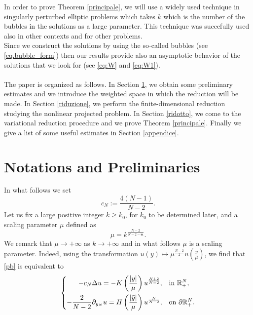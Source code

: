 \documentclass[11pt,a4paper]{amsart}
\begin{document}
In order to prove Theorem \ref{principale}, we will use a widely used technique in singularly perturbed elliptic problems which takes $k$ which is the number of the bubbles in the solutions as a large parameter. This technique was succefully used also in other contexts and for other problems.\\ Since we construct the solutions by using the so-called bubbles (see \eqref{eq.bubble_form}) then our results provide also an asymptotic behavior of the solutions that we look for (see \eqref{eq:W} and \eqref{eq:W1}).\\\\
The paper is organized as follows. In Section \ref{sec.notaions}, we obtain some preliminary estimates and we introduce the weighted space in which the reduction will be made. In Section \ref{riduzione}, we perform the finite-dimensional reduction studying the nonlinear projected problem. In Section \ref{ridotto}, we come to the variational reduction procedure and we prove Theorem \ref{principale}. Finally we give a list of some useful estimates in Section \ref{appendice}.

\section{Notations and Preliminaries}\label{sec.notaions}
In what follows we set $$c_N:=\frac{4(N-1)}{N-2}.$$ 
Let us fix a large positive integer $k\ge k_0$, for $k_0$ to be determined later, and a scaling parameter $\mu$ defined as $$\mu=k^{\frac{N-2}{N-2-\mathfrak m}}.$$
We remark that $\mu\to +\infty$ as $k\to +\infty$ and in what follows  $\mu$ is a scaling parameter. Indeed, using the transformation $u(y) \mapsto \mu^{\frac{N-2}{2}} u\left(\frac{y}{\mu}\right) $, we find that \eqref{pb} is equivalent to
\begin{align}\label{pbscal}
  \left\{
    \begin{aligned}
      -c_N\Delta u = - K\left(\frac{|y|}{\mu}\right) u^{\frac{N+2}{N-2}}, \quad &\text{in }\mathbb{R}_{+}^{N}, \vspace{5pt}\\
      -\frac{2}{N-2}\partial_{y_N}u= H\left(\frac{|\bar{y}|}{\mu}\right) u^{\frac{N}{N-2}}, \quad &\text{on } \partial\mathbb{R}_{+}^{N}.
    \end{aligned}
  \right.
\end{align}
\end{document}
